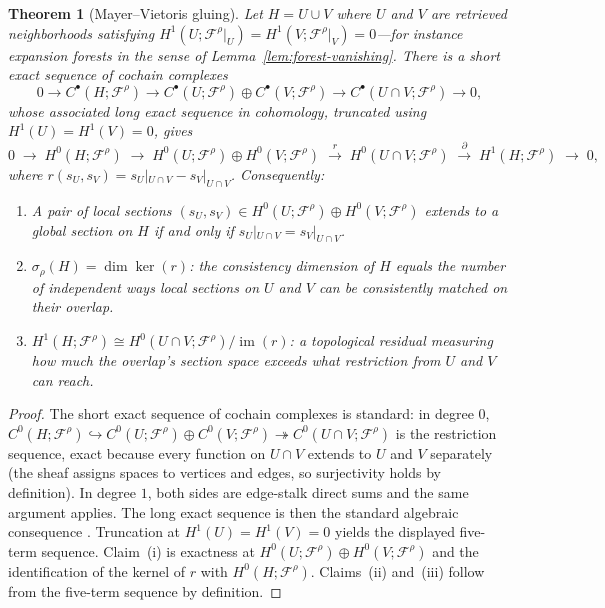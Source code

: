 \documentclass[11pt]{article}
\newtheorem{theorem}[definition]{Theorem}
\newcommand{\F}{\mathcal{F}}
\begin{document}
\begin{theorem}[Mayer--Vietoris gluing]
\label{thm:mv-patching}
Let $H=U\cup V$ where $U$ and $V$ are retrieved neighborhoods satisfying $H^1(U;\F^{\rho}|_U)=H^1(V;\F^{\rho}|_V)=0$---for instance expansion forests in the sense of Lemma~\ref{lem:forest-vanishing}. There is a short exact sequence of cochain complexes
\[
0\to C^{\bullet}(H;\F^{\rho})\to C^{\bullet}(U;\F^{\rho})\oplus C^{\bullet}(V;\F^{\rho})\to C^{\bullet}(U\cap V;\F^{\rho})\to 0,
\]
whose associated long exact sequence in cohomology, truncated using $H^1(U)=H^1(V)=0$, gives
\[
0 \;\to\; H^0(H;\F^{\rho}) \;\to\; H^0(U;\F^{\rho})\oplus H^0(V;\F^{\rho}) \;\xrightarrow{\;r\;}\; H^0(U\cap V;\F^{\rho}) \;\xrightarrow{\;\partial\;}\; H^1(H;\F^{\rho}) \;\to\; 0,
\]
where $r(s_U,s_V)=s_U|_{U\cap V}-s_V|_{U\cap V}$. Consequently:
\begin{enumerate}[leftmargin=*,label=(\roman*)]
\item A pair of local sections $(s_U,s_V)\in H^0(U;\F^{\rho})\oplus H^0(V;\F^{\rho})$ extends to a global section on $H$ if and only if $s_U|_{U\cap V}=s_V|_{U\cap V}$.
\item $\sigma_\rho(H)=\dim\ker(r)$: the consistency dimension of $H$ equals the number of independent ways local sections on $U$ and $V$ can be consistently matched on their overlap.
\item $H^1(H;\F^{\rho})\cong H^0(U\cap V;\F^{\rho})/\operatorname{im}(r)$: a topological residual measuring how much the overlap's section space exceeds what restriction from $U$ and $V$ can reach.
\end{enumerate}
\end{theorem}
\begin{proof}
The short exact sequence of cochain complexes is standard: in degree $0$, $C^0(H;\F^{\rho})\hookrightarrow C^0(U;\F^{\rho})\oplus C^0(V;\F^{\rho})\twoheadrightarrow C^0(U\cap V;\F^{\rho})$ is the restriction sequence, exact because every function on $U\cap V$ extends to $U$ and $V$ separately (the sheaf assigns spaces to vertices and edges, so surjectivity holds by definition). In degree $1$, both sides are edge-stalk direct sums and the same argument applies. The long exact sequence is then the standard algebraic consequence \citep{curry2014}. Truncation at $H^1(U)=H^1(V)=0$ yields the displayed five-term sequence. Claim~(i) is exactness at $H^0(U;\F^{\rho})\oplus H^0(V;\F^{\rho})$ and the identification of the kernel of $r$ with $H^0(H;\F^{\rho})$. Claims~(ii) and~(iii) follow from the five-term sequence by definition.
\end{proof}
\end{document}
